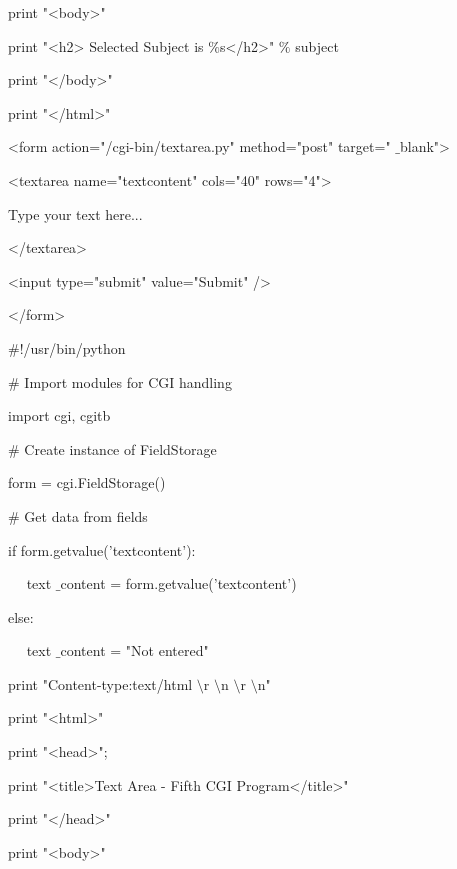 \begin {enumerate}
\begin {enumerate}
print "<body>" \par
\noindent
print "<h2> Selected Subject is  $  \%  $s</h2>"  $  \%  $ subject \par
\noindent
print "</body>" \par
\noindent
print "</html>" \par
\vspace{12pt}
\noindent
<form action="/cgi-bin/textarea.py" method="post" target=" $  \_  $blank"> \par
\noindent
<textarea name="textcontent" cols="40" rows="4"> \par
\noindent
Type your text here... \par
\noindent
</textarea> \par
\noindent
<input type="submit" value="Submit" /> \par
\noindent
</form> \par
\vspace{12pt}
\noindent
 $  \#  $!/usr/bin/python \par
\vspace{12pt}
\noindent
 $  \#  $ Import modules for CGI handling  \par
\noindent
import cgi, cgitb  \par
\vspace{12pt}
\noindent
 $  \#  $ Create instance of FieldStorage  \par
\noindent
form = cgi.FieldStorage()  \par
\vspace{12pt}
\noindent
 $  \#  $ Get data from fields \par
\noindent
if form.getvalue('textcontent'): \par
\noindent
~~ text $  \_  $content = form.getvalue('textcontent') \par
\noindent
else: \par
\noindent
~~ text $  \_  $content = "Not entered" \par
\vspace{12pt}
\noindent
print "Content-type:text/html $  \setminus  $r $  \setminus  $n $  \setminus  $r $  \setminus  $n" \par
\noindent
print "<html>" \par
\noindent
print "<head>"; \par
\noindent
print "<title>Text Area - Fifth CGI Program</title>" \par
\noindent
print "</head>" \par
\noindent
print "<body>" \par

\end{enumerate}
\end{enumerate}
